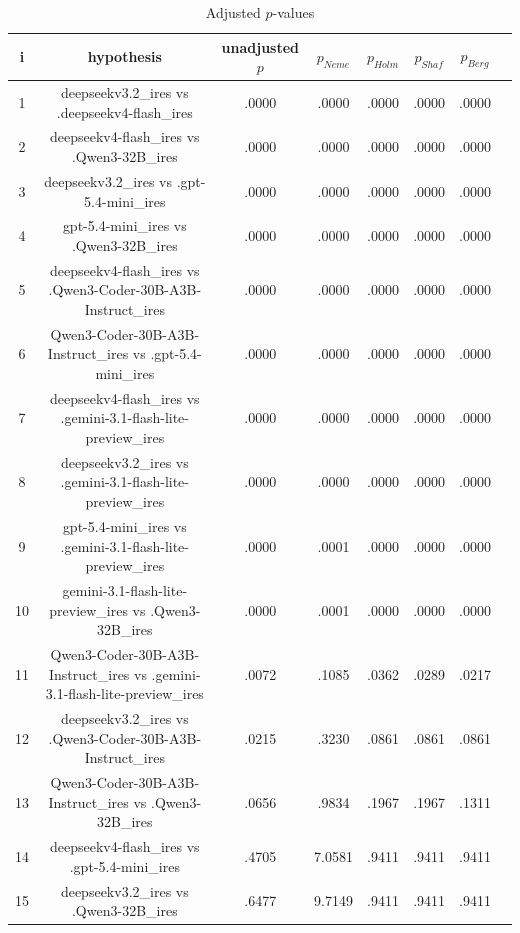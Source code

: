 \documentclass[a4paper,10pt]{article}
\begin{document}
\begin{landscape}
\begin{table}[!htp]
\centering\tiny
\caption{Adjusted $p$-values}
\begin{tabular}{cccccccc}
i&hypothesis&unadjusted $p$&$p_{Neme}$&$p_{Holm}$&$p_{Shaf}$&$p_{Berg}$\\
\hline
1&deepseekv3.2_ires vs .deepseekv4-flash_ires&.0000&.0000&.0000&.0000&.0000\\2&deepseekv4-flash_ires vs .Qwen3-32B_ires&.0000&.0000&.0000&.0000&.0000\\3&deepseekv3.2_ires vs .gpt-5.4-mini_ires&.0000&.0000&.0000&.0000&.0000\\4&gpt-5.4-mini_ires vs .Qwen3-32B_ires&.0000&.0000&.0000&.0000&.0000\\5&deepseekv4-flash_ires vs .Qwen3-Coder-30B-A3B-Instruct_ires&.0000&.0000&.0000&.0000&.0000\\6&Qwen3-Coder-30B-A3B-Instruct_ires vs .gpt-5.4-mini_ires&.0000&.0000&.0000&.0000&.0000\\7&deepseekv4-flash_ires vs .gemini-3.1-flash-lite-preview_ires&.0000&.0000&.0000&.0000&.0000\\8&deepseekv3.2_ires vs .gemini-3.1-flash-lite-preview_ires&.0000&.0000&.0000&.0000&.0000\\9&gpt-5.4-mini_ires vs .gemini-3.1-flash-lite-preview_ires&.0000&.0001&.0000&.0000&.0000\\10&gemini-3.1-flash-lite-preview_ires vs .Qwen3-32B_ires&.0000&.0001&.0000&.0000&.0000\\11&Qwen3-Coder-30B-A3B-Instruct_ires vs .gemini-3.1-flash-lite-preview_ires&.0072&.1085&.0362&.0289&.0217\\12&deepseekv3.2_ires vs .Qwen3-Coder-30B-A3B-Instruct_ires&.0215&.3230&.0861&.0861&.0861\\13&Qwen3-Coder-30B-A3B-Instruct_ires vs .Qwen3-32B_ires&.0656&.9834&.1967&.1967&.1311\\14&deepseekv4-flash_ires vs .gpt-5.4-mini_ires&.4705&7.0581&.9411&.9411&.9411\\15&deepseekv3.2_ires vs .Qwen3-32B_ires&.6477&9.7149&.9411&.9411&.9411\\\hline
\end{tabular}
\end{table}

\end{landscape}
\end{document}
